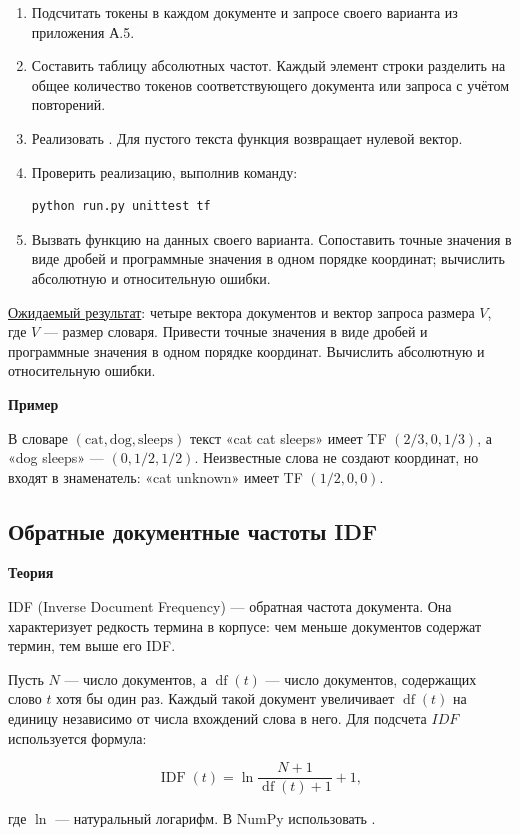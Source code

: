 \documentclass[12pt,a4paper]{article}
\newcommand{\micro}[1]{\subsection{#1}}
\newcommand{\taskhead}[1]{\par\textbf{#1}\par}
\begin{document}
\begin{enumerate}
  \item Подсчитать токены в каждом документе и запросе своего варианта из приложения А.5.
  \item Составить таблицу абсолютных частот. Каждый элемент строки разделить
  на общее количество токенов соответствующего документа или запроса с учётом повторений.
  \item Реализовать .
  Для пустого текста функция возвращает нулевой вектор.
  \item Проверить реализацию, выполнив команду:
  \begin{lstlisting}[style=commands]
  python run.py unittest tf\end{lstlisting}
  \item Вызвать функцию на данных своего варианта.
  Сопоставить точные значения в виде дробей и программные значения
  в одном порядке координат; вычислить абсолютную и относительную ошибки.
\end{enumerate}

\underline{Ожидаемый результат}: четыре вектора документов и вектор запроса размера $V$,
где $V$ --- размер словаря. Привести точные значения в виде дробей и программные значения
в одном порядке координат. Вычислить абсолютную и относительную ошибки.

\taskhead{Пример}

В словаре $(\text{cat},\text{dog},\text{sleeps})$ текст «cat cat sleeps»
имеет TF $(2/3,0,1/3)$, а «dog sleeps» --- $(0,1/2,1/2)$.
Неизвестные слова не создают координат, но входят в знаменатель:
«cat unknown» имеет TF $(1/2,0,0)$.

\newpage

\micro{Обратные документные частоты IDF}
\taskhead{Теория}

IDF (Inverse Document Frequency) --- обратная частота
документа. Она характеризует редкость термина в корпусе:
чем меньше документов содержат термин, тем выше его IDF.

Пусть $N$ --- число документов, а $\operatorname{df}(t)$ ---
число документов, содержащих слово $t$ хотя бы один раз.
Каждый такой документ увеличивает $\operatorname{df}(t)$
на единицу независимо от числа вхождений слова в него. Для подсчета $IDF$ используется формула:

\[
\operatorname{IDF}(t)=\ln\frac{N+1}{\operatorname{df}(t)+1}+1,
\]

где $\operatorname{ln}$ --- натуральный логарифм. В NumPy использовать .
\end{document}
